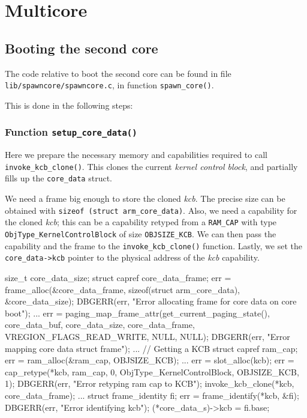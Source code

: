 \documentclass[a4paper,twoside,openright]{report}
\renewcommand{\t}[1]{%
	{\texttt{#1}}}
\begin{document}
\chapter{Multicore}
\section{Booting the second core}

The code relative to boot the second core can be found in file \t{lib/spawncore/spawncore.c}, 
in function \t{spawn\_core()}.

This is done in the following steps:

\subsection{Function \t{setup\_core\_data()}}
Here we prepare the necessary memory and capabilities required to call
\t{invoke\_kcb\_clone()}. This clones the current \emph{kernel control block},
and partially fills up the \t{core\_data} struct.

We need a frame big enough to store the cloned \emph{kcb}. The precise
size can be obtained with \t{sizeof (struct arm\_core\_data)}. Also,
we need a capability for the cloned \emph{kcb}; this can be a capability
retyped from a \t{RAM\_CAP} with type \t{ObjType\_KernelControlBlock} 
of size \t{OBJSIZE\_KCB}. We can then pass the capability and the frame
to the \t{invoke\_kcb\_clone()} function. Lastly, we set the 
\t{core\_data->kcb} pointer to the physical address of the \emph{kcb} capability.

\begin{pandacode}
	size_t core_data_size;
	struct capref core_data_frame; 
	err = frame_alloc(&core_data_frame, sizeof(struct arm_core_data), &core_data_size);
	DBGERR(err, "Error allocating frame for core data on core boot\n");
	...
	err = paging_map_frame_attr(get_current_paging_state(), 
	core_data_buf, core_data_size, core_data_frame, 
	VREGION_FLAGS_READ_WRITE, NULL, NULL);
	DBGERR(err, "Error mapping core data struct frame\n");
	...
	// Getting a KCB
	struct capref ram_cap; 
	err = ram_alloc(&ram_cap, OBJSIZE_KCB);
	...
	err = slot_alloc(kcb);
	err = cap_retype(*kcb, ram_cap, 0, ObjType_KernelControlBlock, OBJSIZE_KCB, 1);
	DBGERR(err, "Error retyping ram cap to KCB\n");
	invoke_kcb_clone(*kcb, core_data_frame);
	...
	struct frame_identity fi;
	err = frame_identify(*kcb, &fi);
	DBGERR(err, "Error identifying kcb\n");
	(*core_data_s)->kcb = fi.base;
\end{pandacode}
\end{document}
